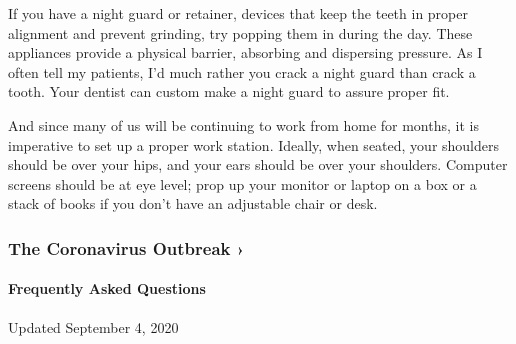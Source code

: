 If you have a night guard or retainer, devices that keep the teeth in
proper alignment and prevent grinding, try popping them in during the
day. These appliances provide a physical barrier, absorbing and
dispersing pressure. As I often tell my patients, I'd much rather you
crack a night guard than crack a tooth. Your dentist can custom make a
night guard to assure proper fit.

And since many of us will be continuing to work from home for months, it
is imperative to set up a proper work station. Ideally, when seated,
your shoulders should be over your hips, and your ears should be over
your shoulders. Computer screens should be at eye level; prop up your
monitor or laptop on a box or a stack of books if you don't have an
adjustable chair or desk.

\href{https://www.nytimes3xbfgragh.onion/news-event/coronavirus?action=click\&pgtype=Article\&state=default\&region=MAIN_CONTENT_3\&context=storylines_faq}{}

\hypertarget{the-coronavirus-outbreak-}{%
\subsubsection{The Coronavirus Outbreak
›}\label{the-coronavirus-outbreak-}}

\hypertarget{frequently-asked-questions}{%
\paragraph{Frequently Asked
Questions}\label{frequently-asked-questions}}

Updated September 4, 2020

